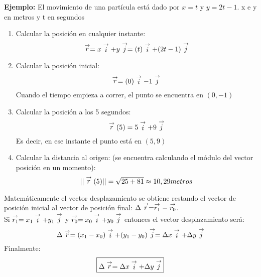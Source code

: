 \textbf{Ejemplo: } El movimiento de una partícula está dado por $x = t$ y $y = 2t-1$. x e y en metros y t en segundos
\begin{enumerate}
    \item Calcular la posición en cualquier instante:
    $$\stackrel{\to}{r} = x\stackrel{\to}{i} + y\stackrel{\to}{j} = (t)\stackrel{\to}{i} + (2t-1)\stackrel{\to}{j}$$
    \item Calcular la posición inicial: 
    $$\stackrel{\to}{r} = (0)\stackrel{\to}{i} - 1\stackrel{\to}{j}$$
    Cuando el tiempo empieza a correr, el punto se encuentra en $(0,-1)$
    \item Calcular la posición a los 5 segundos:
    $$\stackrel{\to}{r}(5) = 5\stackrel{\to}{i} + 9\stackrel{\to}{j}$$
    Es decir, en ese instante el punto está en $(5,9)$
    \item Calcular la distancia al origen: (se encuentra calculando el módulo del vector posición en un momento):
    $$||\stackrel{\to}{r}(5)|| = \sqrt{25+81} \approx 10,29 metros$$
\end{enumerate}

Matemáticamente el vector desplazamiento se obtiene restando el vector de posición inicial al vector de posición final: $\Delta\stackrel{\to}{r} = \stackrel{\to}{r_1} - \stackrel{\to}{r_0}$.\\
Si $\stackrel{\to}{r_1} = x_1\stackrel{\to}{i} + y_1\stackrel{\to}{j}$ y $\stackrel{\to}{r_0} = x_0\stackrel{\to}{i} + y_0\stackrel{\to}{j}$ entonces el vector desplazamiento será:
$$\Delta\stackrel{\to}{r} = (x_1-x_0)\stackrel{\to}{i} + (y_1-y_0)\stackrel{\to}{j} = \Delta x \stackrel{\to}{i} + \Delta y \stackrel{\to}{j}$$
Finalmente:
$$\boxed{\Delta \stackrel{\to}{r} = \Delta x \stackrel{\to}{i} + \Delta y \stackrel{\to}{j}}$$



